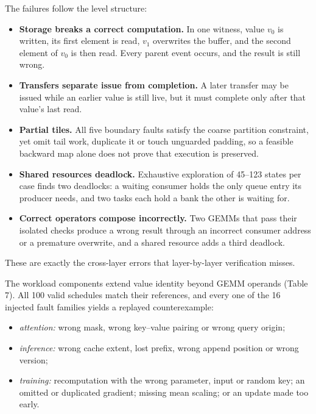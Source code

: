 \documentclass[11pt]{article}
\providecommand{\tightlist}{\setlength{\itemsep}{0pt}\setlength{\parskip}{0pt}}
\begin{document}
The failures follow the level structure:

\begin{itemize}
\tightlist
\item
  \textbf{Storage breaks a correct computation.} In one witness, value \(v_0\) is written, its first element is read, \(v_1\) overwrites the buffer, and the second element of \(v_0\) is then read. Every parent event occurs, and the result is still wrong.
\item
  \textbf{Transfers separate issue from completion.} A later transfer may be issued while an earlier value is still live, but it must complete only after that value's last read.
\item
  \textbf{Partial tiles.} All five boundary faults satisfy the coarse partition constraint, yet omit tail work, duplicate it or touch unguarded padding, so a feasible backward map alone does not prove that execution is preserved.
\item
  \textbf{Shared resources deadlock.} Exhaustive exploration of 45--123 states per case finds two deadlocks: a waiting consumer holds the only queue entry its producer needs, and two tasks each hold a bank the other is waiting for.
\item
  \textbf{Correct operators compose incorrectly.} Two GEMMs that pass their isolated checks produce a wrong result through an incorrect consumer address or a premature overwrite, and a shared resource adds a third deadlock.
\end{itemize}

These are exactly the cross-layer errors that layer-by-layer verification misses.

The workload components extend value identity beyond GEMM operands (Table 7). All 100 valid schedules match their references, and every one of the 16 injected fault families yields a replayed counterexample:

\begin{itemize}
\tightlist
\item
  \emph{attention:} wrong mask, wrong key--value pairing or wrong query origin;
\item
  \emph{inference:} wrong cache extent, lost prefix, wrong append position or wrong version;
\item
  \emph{training:} recomputation with the wrong parameter, input or random key; an omitted or duplicated gradient; missing mean scaling; or an update made too early.
\end{itemize}
\end{document}
